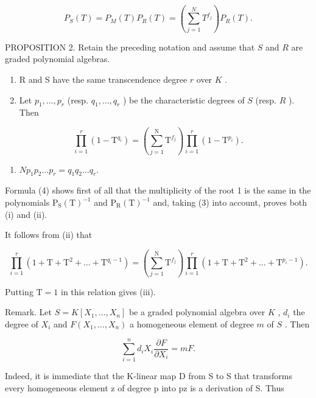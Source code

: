 \[
P _ {S} (T) = P _ {M} (T) P _ {R} (T) = \left(\sum_ {j = 1} ^ {N} T ^ {f _ {j}}\right) P _ {R} (T).\tag{4}
\]

PROPOSITION 2. Retain the preceding notation and assume that \(S\) and \(R\) are graded polynomial algebras.

\begin{enumerate}
\def\labelenumi{(\roman{enumi})}
\item
  R and S have the same transcendence degree \(r\) over \(K\) .
\item
  Let \(p_1, \ldots, p_r\) (resp. \(q_1, \ldots, q_r\) ) be the characteristic degrees of \(S\) (resp. \(R\) ). Then
\end{enumerate}

\[
\prod_ {i = 1} ^ {r} \left(1 - \mathrm{T} ^ {q _ {i}}\right) = \left(\sum_ {j = 1} ^ {\mathrm{N}} \mathrm{T} ^ {f _ {j}}\right) \prod_ {i = 1} ^ {r} \left(1 - \mathrm{T} ^ {p _ {i}}\right).
\]

\begin{enumerate}
\def\labelenumi{(\roman{enumi})}
\setcounter{enumi}{2}
\tightlist
\item
  \(Np_{1}p_{2}\ldots p_{r}=q_{1}q_{2}\ldots q_{r}.\)
\end{enumerate}

Formula (4) shows first of all that the multiplicity of the root 1 is the same in the polynomials \(\mathrm{P}_{\mathrm{S}}(\mathrm{T})^{-1}\) and \(\mathrm{P}_{\mathrm{R}}(\mathrm{T})^{-1}\) and, taking (3) into account, proves both (i) and (ii).

It follows from (ii) that

\[
\prod_ {i = 1} ^ {r} \left(1 + \mathrm{T} + \mathrm{T} ^ {2} + \dots + \mathrm{T} ^ {q _ {i} - 1}\right) = \left(\sum_ {j = 1} ^ {\mathrm{N}} \mathrm{T} ^ {f _ {j}}\right) \prod_ {i = 1} ^ {r} \left(1 + \mathrm{T} + \mathrm{T} ^ {2} + \dots + \mathrm{T} ^ {p _ {i} - 1}\right).
\]

Putting \(\mathrm{T} = 1\) in this relation gives (iii).

Remark. Let \(S = K[X_1, \ldots, X_n]\) be a graded polynomial algebra over \(K\) , \(d_i\) the degree of \(X_i\) and \(F(X_1, \ldots, X_n)\) a homogeneous element of degree \(m\) of \(S\) . Then

\[
\sum_ {i = 1} ^ {n} d _ {i} X _ {i} \frac {\partial F}{\partial X _ {i}} = m F.\tag{5}
\]

Indeed, it is immediate that the K-linear map D from S to S that transforms every homogeneous element z of degree p into pz is a derivation of S. Thus

